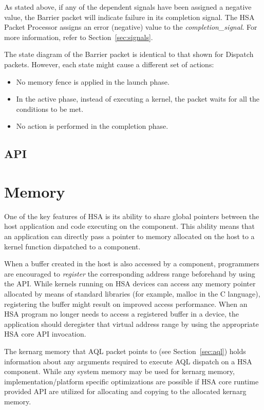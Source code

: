 \documentclass[final]{book}
\newcommand{\reffld}[1]{\textit{#1}}
\begin{document}
As stated above, if any of the dependent signals have been assigned a negative
value, the Barrier packet will indicate failure in its completion signal. The
HSA Packet Processor assigns an error (negative) value to the
\reffld{completion_signal}.  For more information, refer to
Section~\ref{sec:signals}.

The state diagram of the Barrier packet is identical to that shown for Dispatch
packets. However, each state might cause a different set of actions:
\begin{itemize}
\item No memory fence is applied in the launch phase.
\item In the active phase, instead of executing a kernel, the packet waits for
  all the conditions to be met.
\item No action is performed in the completion phase.
\end{itemize}

\subsection{API}


\section{Memory}\label{memory}

One of the key features of HSA is its ability to share global pointers between
the host application and code executing on the component. This ability means
that an application can directly pass a pointer to memory allocated on the host
to a kernel function dispatched to a component.

When a buffer created in the host is also accessed by a component, programmers
are encouraged to \emph{register} the corresponding address range beforehand by
using the  API. While kernels running on HSA devices
can access any memory pointer allocated by means of standard libraries (for
example, malloc in the C language), registering the buffer might result on
improved access performance.  When an HSA program no longer needs to access a
registered buffer in a device, the application should deregister that virtual
address range by using the appropriate HSA core API invocation.

The kernarg memory that AQL packet points to (see Section~\ref{sec:aql}) holds
information about any arguments required to execute AQL dispatch on a HSA
component. While any system memory may be used for kernarg memory,
implementation/platform specific optimizations are possible if HSA core runtime
provided API are utilized for allocating and copying to the allocated kernarg
memory.
\end{document}
